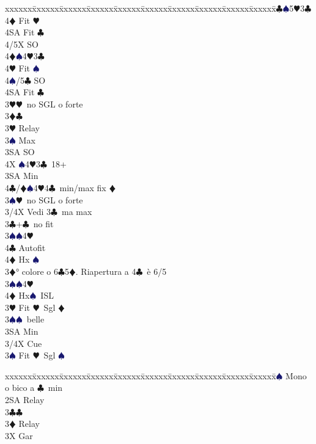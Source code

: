 \documentclass[a4paper,italian]{article}
\newcommand{\BC}{\textcolor{OliveGreen}{$\clubsuit$}}
\newcommand{\BD}{\textcolor{RedOrange}{$\vardiamondsuit$}}
\newcommand{\BH}{\textcolor{Red2}{$\varheartsuit${}}}
\newcommand{\BS}{\textcolor{MidnightBlue}{$\spadesuit${}}}
\newenvironment{bidtable}
{\begin{tabbing}

    xxxxxx\=xxxxxx\=xxxxxx\=xxxxxx\=xxxxxx\=xxxxxx\=xxxxxx\=xxxxxx\=xxxxxx\=xxxxxx\=\kill}
{\end{tabbing} }%
\begin{document}
\begin{multicols}{2}
\begin{bidtable}
        4\BC {}\BS5\BH3\BC \+\\
        4\BD \> Fit \BH\\
        4SA \> Fit \BC\\
        4/5X \> SO\-\\
        4\BD {}\BS 4\BH 3\BC\+\\
        4\BH \> Fit \BS\\
        4\BS/5\BC \> SO\\
        4SA \> Fit \BC\-\-\\
        3\BH {}\BH\ no SGL o forte\-\\
        3\BD {}\BC \+\\
        3\BH \> Relay\+\\
        3\BS \> Max\+\\
        3SA \> SO\+\\
        4X \BS 4\BH 3\BC\ 18+\-\-\\
        3SA \> Min\\
        4\BC/\BD {}\BS 4\BH 4\BC\ min/max fix \BD \-\\
        3\BS {}\BH\ no SGL o forte\-\\
        3/4X \> Vedi 3\BC\ ma max\-\\
        3\BC {}+\BC\ no fit\+\\
        3\BS {}\BS 4\BH \+\\
        4\BC \> Autofit\\
        4\BD \> Hx \BS \-\-\\
        3\BD {}° colore o 6\BC 5\BD . Riapertura a 4\BC\ è 6/5\+\\
        3\BS {}\BS4\BH\+\\
        4\BD \> Hx\BS\ ISL\-\-\\
        3\BH \> Fit \BH\ Sgl \BD \+\\
        3\BS {}\BS\ belle\\
        3SA \> Min\\
        3/4X \> Cue\-\\
        3\BS \> Fit \BH\ Sgl \BS \-\\
    \end{bidtable}
    \columnbreak
    \begin{bidtable}
        2\BS \> Mono o bico a \BC\ min\+\\
        2SA \> Relay\+\\
        3\BC {}\BC \+\\
        3\BD \> Relay\+\\
        3X \> Gar\\

\end{bidtable}
\end{multicols}
\end{document}
